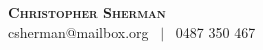 \documentclass[letterpaper,12pt]{res}
\begin{document}
\noindent \textbf{\Huge \scshape Christopher Sherman} \\ 
csherman@mailbox.org \ $|$ \ 0487 350 467  \\











 
\end{document}
